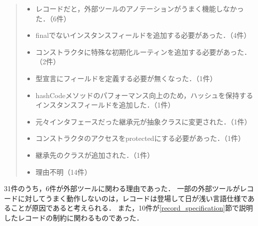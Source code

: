 \begin{quote}
  \begin{itemize}
      \item レコードだと，外部ツールのアノテーションがうまく機能しなかった．（6件）
      \item finalでないインスタンスフィールドを追加する必要があった．（4件）
      \item コンストラクタに特殊な初期化ルーティンを追加する必要があった．（2件）
      \item 型宣言にフィールドを定義する必要が無くなった．（1件）
      \item hashCodeメソッドのパフォーマンス向上のため，ハッシュを保持するインスタンスフィールドを追加した．（1件）
      \item 元々インタフェースだった継承元が抽象クラスに変更された．（1件）
      \item コンストラクタのアクセスをprotectedにする必要があった．（1件）
      \item 継承先のクラスが追加された．（1件）
      \item 理由不明（14件）
  \end{itemize}
\end{quote}

31件のうち，6件が外部ツールに関わる理由であった．
一部の外部ツールがレコードに対してうまく動作しないのは，レコードは登場して日が浅い言語仕様であることが原因であると考えられる．
また，10件が\ref{record_specification}節で説明したレコードの制約に関わるものであった．